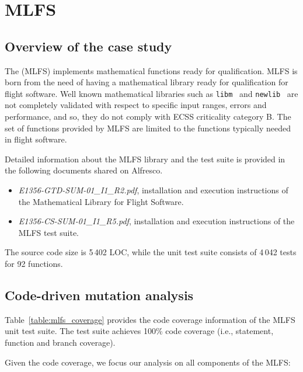 \clearpage

\section{MLFS}
\label{sec:caseStudies:GSL:MLSF}

\subsection{Overview of the case study}

The  (MLFS) implements mathematical functions ready for qualification. 
MLFS is born from the need of having a mathematical library ready for qualification for flight software. Well known mathematical libraries such as \texttt{libm}~\cite{libm} and \texttt{newlib}~\cite{newlib} are not completely validated with respect to specific input ranges, errors and performance, and so, they do not comply with ECSS criticality category B.
The set of functions provided by MLFS are limited to the functions typically needed in flight software. 

Detailed information about the MLFS library and the test suite is provided in the following documents shared on Alfresco.

\begin{itemize}
	\item \emph{E1356-GTD-SUM-01\_I1\_R2.pdf}, installation and execution instructions of the Mathematical Library for Flight Software. 
	\item \emph{E1356-CS-SUM-01\_I1\_R5.pdf}, installation and execution instructions of the MLFS test suite.
\end{itemize}

The source code size is 5\,402 LOC, while the unit test suite consists of 4\,042 tests for 92 functions.

\subsection{Code-driven mutation analysis}



Table~\ref{table:mlfs_coverage} provides the code coverage information of the MLFS unit test suite. The test suite achieves 100\% code coverage (i.e., statement, function and branch coverage).

Given the code coverage, we focus our analysis on all components of the MLFS:

